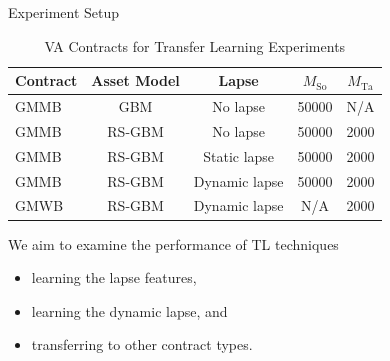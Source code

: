 \documentclass[9pt,handout]{beamer}
\begin{document}
\begin{frame}{Experiment Setup}

    \begin{table}[ht!] 
        \centering
        \begin{tabular}{lcccc} 
        \toprule
        \textbf{Contract} & \textbf{Asset Model} & \textbf{Lapse} & \textbf{$M_{\text{So}}$}  & \textbf{$M_{\text{Ta}}$}\\
        \midrule
        GMMB & GBM & No lapse & 50000 & N/A \\
        GMMB & RS-GBM & No lapse & 50000 & 2000 \\
        GMMB & RS-GBM & Static lapse & 50000 & 2000 \\
        GMMB & RS-GBM & Dynamic lapse & 50000 & 2000 \\
        GMWB & RS-GBM & Dynamic lapse & N/A & 2000 \\
        \bottomrule
        \end{tabular}
        \caption{VA Contracts for Transfer Learning Experiments}
    \end{table}

    We aim to examine the performance of TL techniques
    \begin{itemize}
        \item   learning the lapse features,
        \item   learning the dynamic lapse, and 
        \item   transferring to other contract types.
    \end{itemize}



\end{frame}
\end{document}

